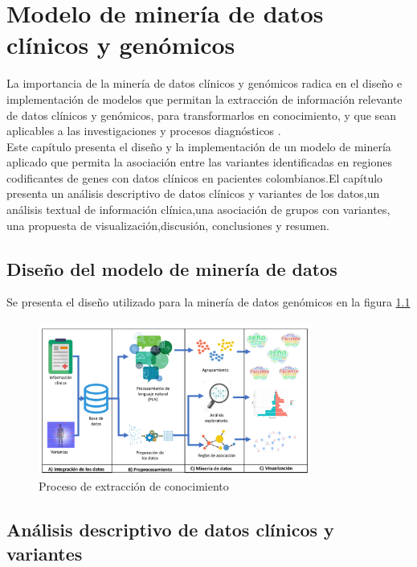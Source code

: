 \chapter{Modelo de minería de datos clínicos y genómicos}

La importancia de la minería de datos clínicos y genómicos radica en el diseño e implementación de modelos que permitan la extracción de información relevante de datos clínicos y genómicos, para transformarlos en conocimiento, y que sean aplicables a las investigaciones y procesos diagnósticos \cite{Farid2016}. \\  

Este capítulo presenta el diseño y la implementación de un modelo de minería aplicado que permita la asociación entre las variantes identificadas en regiones codificantes de genes con datos clínicos en pacientes colombianos.El capítulo presenta un análisis descriptivo de datos clínicos y variantes de los datos,un análisis textual de información clínica,una asociación de grupos con variantes, una propuesta de visualización,discusión, conclusiones y resumen. 

\section{Diseño del modelo de minería de datos}

Se presenta el diseño utilizado para la minería de datos genómicos en la figura \ref{fig:kdd}

\begin{figure}[h!]
	\centering
	\includegraphics[width=0.8\textwidth]{Kap4/KDDtesis.pdf}
	\caption{Proceso de extracción de conocimiento}
	\label{fig:kdd}
\end{figure}


\section{Análisis descriptivo de datos clínicos y variantes}

